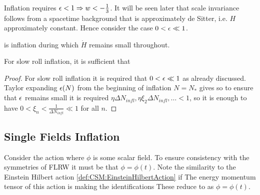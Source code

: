 \documentclass{article}
\begin{document}
Inflation requires $\epsilon < 1 \Rightarrow w < -\frac{1}{3}$. It will be seen later that scale invariance follows from a spacetime background that is approximately de Sitter, i.e. $H$ approximately constant. Hence consider the case $0< \epsilon \ll 1$. 

\begin{definition}
 is inflation during which $\dot{H}$ remains small throughout.
\end{definition}

\begin{prop}
For slow roll inflation, it is sufficient that 
\end{prop}
\begin{proof}
For slow roll inflation it is required that $0 < \epsilon \ll 1$ as already discussed. Taylor expanding $\epsilon(N)$ from the beginning of inflation $N=N_\ast$ gives 
so to ensure that $\epsilon$ remains small it is required $\eta \Delta N_{infl}, \eta \xi_2 \Delta N_{infl}, \dots < 1$, so it is enough to have $0<\xi_n < \frac{1}{\Delta N_{infl}} \ll 1$ for all $n$. 
\end{proof}

\subsection{Single Fields Inflation}

Consider the action
where $\phi$ is some scalar field. To ensure consistency with the symmetries of FLRW it must be that $\phi = \phi(t)$.  Note the similarity to the Einstein Hilbert action \ref{def:CSM:EinsteinHilbertAction} if 
The energy momentum tensor of this action is 
making the identifications 
These reduce to 
as $\phi=\phi(t)$. 
\end{document}
